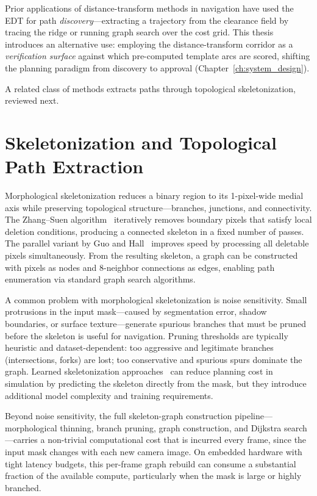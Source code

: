 \documentclass[12pt,letterpaper,oneside]{report}
\begin{document}
Prior applications of distance-transform methods in navigation have used the EDT for path \emph{discovery}---extracting a trajectory from the clearance field by tracing the ridge or running graph search over the cost grid. This thesis introduces an alternative use: employing the distance-transform corridor as a \emph{verification surface} against which pre-computed template arcs are scored, shifting the planning paradigm from discovery to approval (Chapter~\ref{ch:system_design}).

A related class of methods extracts paths through topological skeletonization, reviewed next.


\section{Skeletonization and Topological Path Extraction}

Morphological skeletonization reduces a binary region to its 1-pixel-wide medial axis while preserving topological structure---branches, junctions, and connectivity. The Zhang--Suen algorithm~\cite{zhang_suen} iteratively removes boundary pixels that satisfy local deletion conditions, producing a connected skeleton in a fixed number of passes. The parallel variant by Guo and Hall~\cite{guo_hall} improves speed by processing all deletable pixels simultaneously. From the resulting skeleton, a graph can be constructed with pixels as nodes and 8-neighbor connections as edges, enabling path enumeration via standard graph search algorithms.

A common problem with morphological skeletonization is noise sensitivity. Small protrusions in the input mask---caused by segmentation error, shadow boundaries, or surface texture---generate spurious branches that must be pruned before the skeleton is useful for navigation. Pruning thresholds are typically heuristic and dataset-dependent: too aggressive and legitimate branches (intersections, forks) are lost; too conservative and spurious spurs dominate the graph. Learned skeletonization approaches~\cite{flores2025skeleton} can reduce planning cost in simulation by predicting the skeleton directly from the mask, but they introduce additional model complexity and training requirements.

Beyond noise sensitivity, the full skeleton-graph construction pipeline---morphological thinning, branch pruning, graph construction, and Dijkstra search---carries a non-trivial computational cost that is incurred every frame, since the input mask changes with each new camera image. On embedded hardware with tight latency budgets, this per-frame graph rebuild can consume a substantial fraction of the available compute, particularly when the mask is large or highly branched.
\end{document}
